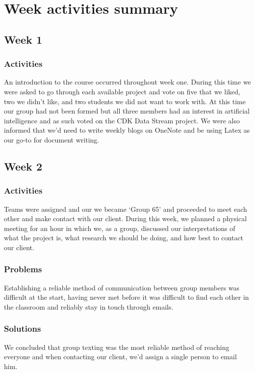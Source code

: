 \documentclass[onecolumn, draftclsnofoot,10pt, compsoc]{IEEEtran}
\begin{document}
\section{Week activities summary}
\subsection{Week 1}
\subsubsection{Activities}
An introduction to the course occurred throughout week one. During this time we were asked to go through each available project and vote on five that we liked, two we didn’t like, and two students we did not want to work with. At this time our group had not been formed but all three members had an interest in artificial intelligence and as such voted on the CDK Data Stream project. We were also informed that we’d need to write weekly blogs on OneNote and be using Latex as our go-to for document writing.

\subsection{Week 2}
\subsubsection{Activities}
Teams were assigned and our we became ‘Group 65’ and proceeded to meet each other and make contact with our client. During this week, we planned a physical meeting for an hour in which we, as a group, discussed our interpretations of what the project is, what research we should be doing, and how best to contact our client.

\subsubsection{Problems}
Establishing a reliable method of communication between group members was difficult at the start, having never met before it was difficult to find each other in the classroom and reliably stay in touch through emails. 

\subsubsection{Solutions}
We concluded that group texting was the most reliable method of reaching everyone and when contacting our client, we’d assign a single person to email him.
\end{document}
